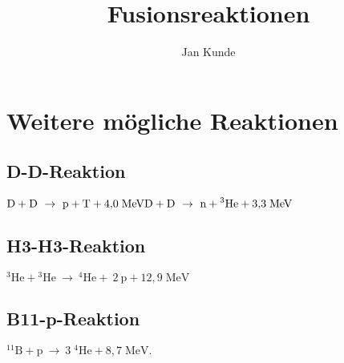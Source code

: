 \documentclass[12pt]{article}
\title{Fusionsreaktionen}
\author{Jan Kunde}
\begin{document}
\maketitle

\section*{Weitere mögliche Reaktionen}
\subsection*{D-D-Reaktion}
    \begin{math}
        {\displaystyle \mathrm {D} +\mathrm {D} \ \rightarrow \ \mathrm {p} +\mathrm {T} +4{,}0\;\mathrm {MeV} } \\
        {\displaystyle \mathrm {D} +\mathrm {D} \ \rightarrow \ \mathrm {n} +{}^{3}\!\,\mathrm {He} +3{,}3\;\mathrm {MeV} }
    \end{math}
\subsection*{H3-H3-Reaktion}
    \begin{math}
        {\displaystyle \mathrm {^{3}He+\!^{3}He\ \rightarrow \ ^{4}He+\ 2\ p+12{,}9\;MeV} }
    \end{math}    
\subsection*{B11-p-Reaktion}
    \begin{math}
        {\displaystyle \mathrm {^{11}B+\!p\ \rightarrow \ 3\;^{4}He+8{,}7\;MeV} }.
    \end{math}
\end{document}
